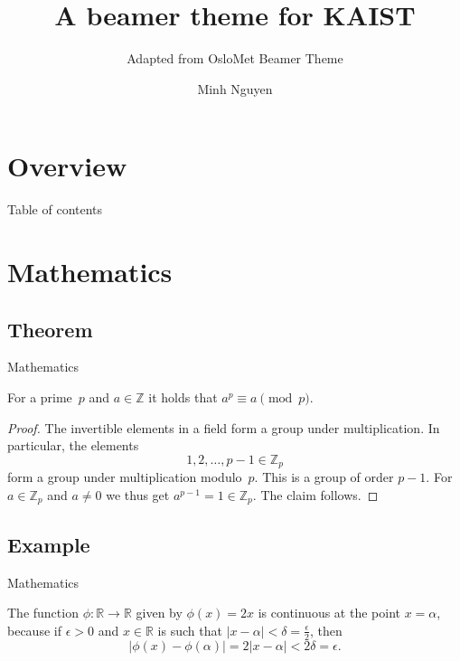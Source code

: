 \documentclass[UKenglish, aspectratio = 169]{beamer}
\author[Nguyen]{Minh Nguyen}
\institute{Department of Everything}
\title{A beamer theme for KAIST}
\subtitle{Adapted from OsloMet Beamer Theme}
\begin{document}
\section{Overview}
%
%
\begin{frame}{Table of contents}
    \tableofcontents
\end{frame}

\section{Mathematics}
\subsection{Theorem}



\begin{frame}{Mathematics}

    \begin{theorem}
        For a prime~\(p\) and \(a \in \mathbb{Z}\) it holds that \(a^p \equiv a \pmod{p}\).
    \end{theorem}

    \begin{proof}
        The invertible elements in a field form a group under multiplication.
        In particular, the elements
        \begin{equation*}
            1, 2, \ldots, p - 1 \in \mathbb{Z}_p
        \end{equation*}
        form a group under multiplication modulo~\(p\).
        This is a group of order \(p - 1\).
        For \(a \in \mathbb{Z}_p\) and \(a \neq 0\) we thus get \(a^{p-1} = 1 \in \mathbb{Z}_p\).
        The claim follows.
    \end{proof}
\end{frame}

\showlogo

\subsection{Example}

\begin{frame}{Mathematics}

    \begin{example}
        The function \(\phi \colon \mathbb{R} \to \mathbb{R}\) given by \(\phi(x) = 2x\) is continuous at the point \(x = \alpha\),
        because if \(\epsilon > 0\) and \(x \in \mathbb{R}\) is such that \(\lvert x - \alpha \rvert < \delta = \frac{\epsilon}{2}\),
        then
        \begin{equation*}
            \lvert \phi(x) - \phi(\alpha)\rvert = 2\lvert x - \alpha \rvert < 2\delta = \epsilon.
        \end{equation*}
    \end{example}
\end{frame}
\end{document}
